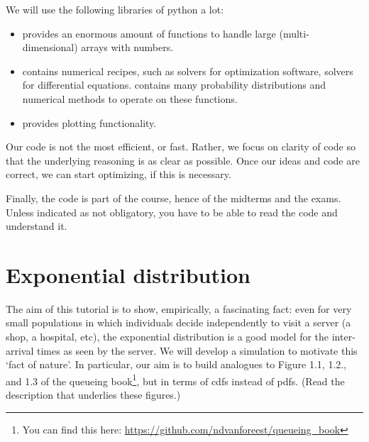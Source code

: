 We will use the following libraries of python a lot:
\begin{itemize}
\item {}  provides an enormous amount of functions to handle large (multi-dimensional) arrays with numbers. 
\item {} contains numerical recipes, such as solvers for optimization software, solvers for differential equations.  contains many probability distributions and numerical methods to operate on these functions. 
\item {} provides plotting functionality.
\end{itemize}

Our code is not the most efficient, or fast.
Rather, we focus on clarity of code so that the underlying reasoning is as clear as possible.
Once our ideas and code are correct, we can start optimizing, if this is necessary.

Finally, the code is part of the course, hence of the midterms and the exams.
Unless indicated as not obligatory, you have to be able to read the code and understand it.


\clearpage
\section{Exponential distribution}

The aim of this tutorial is to show, empirically, a fascinating fact: even for very small populations in which individuals decide independently to visit a server (a shop, a hospital, etc), the exponential distribution is a good model for the inter-arrival times as seen by the server.
We will develop a simulation to motivate this `fact of nature'.
In particular, our aim is to build analogues to Figure 1.1, 1.2., and 1.3 of the queueing book\footnote{You can find this here: \url{https://github.com/ndvanforeest/queueing_book}}, but in terms of cdfs instead of pdfs.
(Read the description that underlies these figures.)


